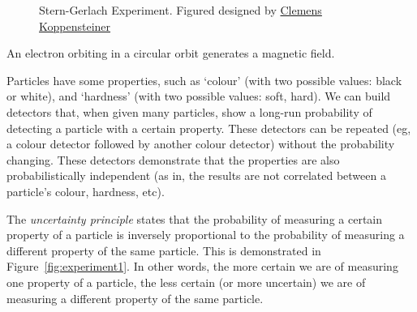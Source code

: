 \begin{figure}[htp]
\caption{Stern-Gerlach Experiment. Figured designed by \href{http://clemens.koppensteiner.site}{Clemens Koppensteiner}}\label{fig:stern_gerlach}\end{figure}
\begin{note}
    An electron orbiting in a circular orbit generates a magnetic field.
\end{note}
Particles have some properties, such as `colour' (with two possible values: black or white), and `hardness' (with two possible values: soft, hard). We can build detectors that, when given many particles, show a long-run probability of detecting a particle with a certain property. These detectors can be repeated (eg, a colour detector followed by another colour detector) without the probability changing. These detectors demonstrate that the properties are also probabilistically independent (as in, the results are not correlated between a particle's colour, hardness, etc).

\begin{definition}
    The \emph{uncertainty principle} states that the probability of measuring a certain property of a particle is inversely proportional to the probability of measuring a different property of the same particle. This is demonstrated in Figure~\ref{fig:experiment1}. In other words, the more certain we are of measuring one property of a particle, the less certain (or more uncertain) we are of measuring a different property of the same particle.
\end{definition}

